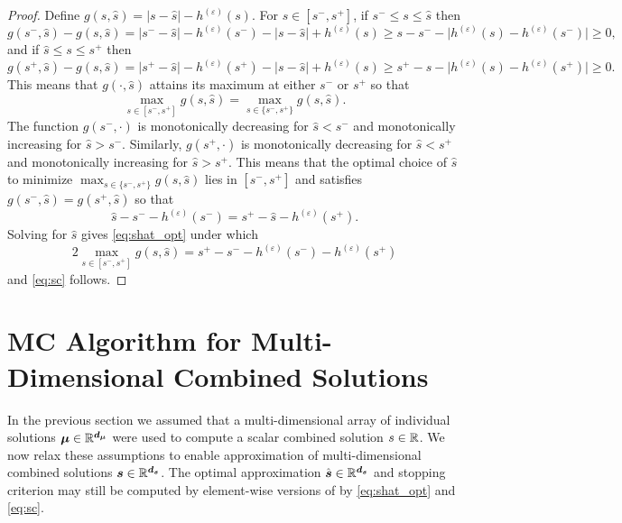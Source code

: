 \documentclass{article}[12pt]
\begin{document}
\begin{proof}
    Define $g(s,\hat{s})=\lvert s - \hat{s} \rvert -h^{(\varepsilon)}(s)$. For $s \in [s^-,s^+]$, if $s^- \leq s \leq \hat{s}$ then 
    $$g(s^-,\hat{s})-g(s,\hat{s}) = \lvert s^- - \hat{s} \rvert -h^{(\varepsilon)}(s^-) - \lvert s - \hat{s} \rvert  + h^{(\varepsilon)}(s) \geq s - s^- - \lvert h^{(\varepsilon)}(s)-h^{(\varepsilon)}(s^-) \rvert \geq 0,$$
    and if $\hat{s} \leq s \leq s^+$ then 
    $$g(s^+,\hat{s})-g(s,\hat{s}) = \lvert s^+ - \hat{s} \rvert -h^{(\varepsilon)}(s^+) - \lvert s - \hat{s} \rvert  + h^{(\varepsilon)}(s) \geq s^+ - s - \lvert h^{(\varepsilon)}(s)-h^{(\varepsilon)}(s^+) \rvert \geq 0.$$
    This means that $g(\cdot,\hat{s})$ attains its maximum at either $s^-$ or $s^+$ so that
    \begin{equation*}
        \max_{s \in [s^-,s^+]} g(s,\hat{s}) = \max_{s \in \{s^-,s^+\}} g(s,\hat{s}).
    \end{equation*}
    The function $g(s^-,\cdot)$ is monotonically decreasing for $\hat{s} < s^-$ and monotonically increasing for $\hat{s} > s^-$. Similarly, $g(s^+,\cdot)$ is monotonically decreasing for $\hat{s} < s^+$ and monotonically increasing for $\hat{s} > s^+$. This means that the optimal choice of $\hat{s}$ to minimize $\max_{s \in \{s^-,s^+\}} g(s,\hat{s})$ lies in $[s^-,s^+]$ and satisfies $g(s^-,\hat{s}) = g(s^+,\hat{s})$ so that 
    $$\hat{s} - s^- - h^{(\varepsilon)}(s^-) = s^+ - \hat{s} - h^{(\varepsilon)}(s^+).$$
    Solving for $\hat{s}$ gives \eqref{eq:shat_opt} under which 
    $$2 \max_{s \in [s^-,s^+]} g(s,\hat{s}) =  s^+  -  s^-  - h^{(\varepsilon)}(s^-) - h^{(\varepsilon)}(s^+)$$
    and \eqref{eq:sc} follows. 
\end{proof}

\section{MC Algorithm for Multi-Dimensional Combined Solutions} \label{sec: Vectorized Implementation}

In the previous section we assumed that a multi-dimensional array of individual solutions $\boldsymbol{\mu} \in \mathbb{R}^{\boldsymbol{d}_{\boldsymbol{\mu}}}$ were used to compute a scalar combined solution $s \in \mathbb{R}$. We now relax these assumptions to enable approximation of multi-dimensional combined solutions $\boldsymbol{s} \in \mathbb{R}^{\boldsymbol{d}_{\boldsymbol{s}}}$. The optimal approximation $\hat{\boldsymbol{s}} \in \mathbb{R}^{\boldsymbol{d}_{\boldsymbol{s}}}$ and stopping criterion may still be computed by element-wise versions of by \eqref{eq:shat_opt} and \eqref{eq:sc}. 
\end{document}
